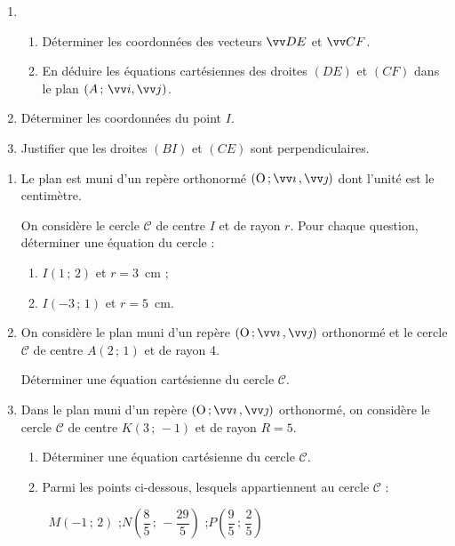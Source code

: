 \documentclass[a4paper,11pt]{article}
\begin{document}
\begin{enumerate}
	\item 
	\begin{enumerate}
		\item Déterminer les coordonnées des vecteurs $\vect{DE}$ et $\vect{CF}$.
		\item En déduire les équations cartésiennes des droites $(DE)$ et $(CF)$ dans le plan $\left(A\,;\,\vect{i},\vect{j}\right)$.
	\end{enumerate}
	\item Déterminer les coordonnées du point $I$.
	\item Justifier que les droites $(BI)$ et $(CE)$ sont perpendiculaires.
\end{enumerate}

\pagebreak


\begin{enumerate}
	\item Le plan est muni d’un repère orthonormé $\Rij$ dont l’unité est le centimètre.
	
	On considère le cercle $\mathscr{C}$ de centre $I$ et de rayon $r$. Pour chaque question, déterminer une équation du cercle :
	\begin{enumerate}
		\item $I(1\,;\,2)$ et $r=3$~cm ;
		\item $I(-3\,;\,1)$ et $r=5$~cm.
	\end{enumerate}
	\item On considère le plan muni d’un repère $\Rij$ orthonormé et le cercle $\mathscr{C}$ de centre $A(2\,;\,1)$ et de rayon 4.
	
	Déterminer une équation cartésienne du cercle $\mathscr{C}$.
	\item Dans le plan muni d’un repère $\Rij$ orthonormé, on considère le cercle $\mathscr{C}$ de centre $K(3\,;\,-1)$ et de rayon $R=5$.
	\begin{enumerate}
		\item Déterminer une équation cartésienne du cercle $\mathscr{C}$.
		\item Parmi les points ci-dessous, lesquels appartiennent au cercle $\mathscr{C}$ :
		
		\hfill~$M(-1\,;\,2)$ \quad;\quad $N\left(\dfrac85\,;\,-\dfrac{29}{5}\right)$ \quad;\quad $P\left(\dfrac95\,;\,\dfrac25\right)$\hfill~
	\end{enumerate}
\end{enumerate}
\end{document}
